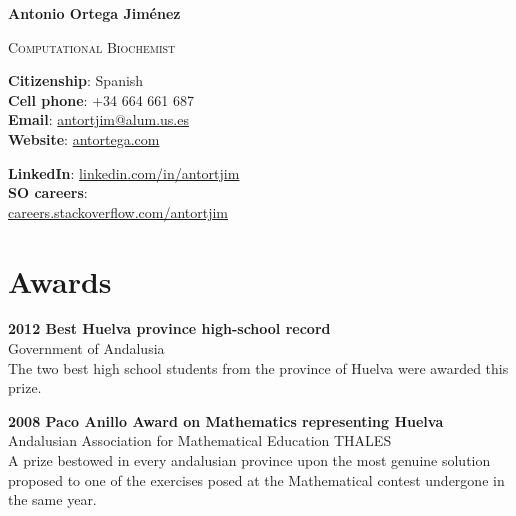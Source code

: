 \documentclass[letterpaper]{article}
\def\name{\textcolor{StrongRed}{Antonio Ortega Jim\'enez}}
\renewenvironment{itemize}{
  \begin{list}{}{
    \setlength{\leftmargin}{1em}
  }
}{
  \end{list}
}
\begin{document}
\thispagestyle{empty}

\centerline{\LARGE\bf \name}

\vspace{0.1in}
\centerline{\textcolor{awesome-red}{\textsc{Computational Biochemist}}}


\vspace{0.25in}


\begin{minipage}[t]{0.6\textwidth}
  \textbf{Citizenship}: Spanish \\
  \textbf{Cell phone}: +34 664 661 687 \\
  \textbf{Email}: \href{mailto:antortjim@alum.us.es}{antortjim@alum.us.es} \\
  \textbf{Website}: \href{http://www.antortega.com}{antortega.com} \\
  
\end{minipage}
\begin{minipage}[t]{0.3\textwidth}
  \textbf{LinkedIn}: \href{http://www.linkedin.com/in/antortjim}{linkedin.com/in/antortjim} \\
   \textbf{SO careers}:\\
   \href{http://careers.stackoverflow.com/antortjim}{careers.stackoverflow.com/antortjim} \\

\end{minipage}

\section*{Awards}

\begin{itemize}

\item \textbf{2012 Best Huelva province high-school record} \\ Government of Andalusia \\ The two best high school students from the province of Huelva were awarded this prize.

\item \textbf{2008 Paco Anillo Award on Mathematics representing Huelva} \\ Andalusian Association for Mathematical Education THALES \\  A prize bestowed in every andalusian province upon the most genuine solution proposed to one of the exercises posed at the Mathematical contest undergone in the same year.
\end{itemize}
\end{document}
